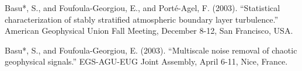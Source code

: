 \begin{etaremune}[topsep=0pt,itemsep=0pt,partopsep=0pt,parsep=0pt]
\item Basu*, S., and Foufoula-Georgiou, E., and Porté-Agel, F. (2003). ``Statistical characterization of stably stratified atmospheric boundary layer turbulence.'' American Geophysical Union Fall Meeting, December 8-12, San Francisco, USA.
\item Basu*, S., and Foufoula-Georgiou, E. (2003). ``Multiscale noise removal of chaotic geophysical signals.'' EGS-AGU-EUG Joint Assembly, April 6-11, Nice, France.

\end{etaremune}